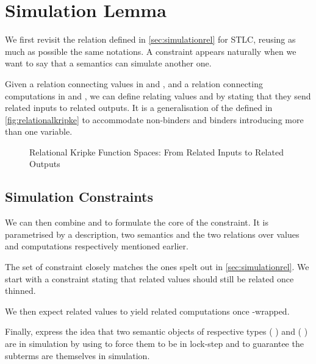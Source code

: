 \section{Simulation Lemma}\label{section:simulation}

We first revisit the  relation defined in \cref{sec:simulationrel}
for STLC, reusing as much as possible the same notations. A  constraint
appears naturally when we want to say that a semantics can simulate another one.

Given a relation  connecting values in  and , and a relation
 connecting computations in  and , we can define 
relating values    and    by
stating that they send related inputs to related outputs. It is a generalisation of
the  defined in \cref{fig:relationalkripke} to accommodate non-binders
and binders introducing more than one variable.

\begin{figure}[h]
\caption{Relational Kripke Function Spaces: From Related Inputs to Related Outputs}
\end{figure}

\subsection{Simulation Constraints}

We can then combine  and  to formulate the
core of the  constraint. It is parametrised by a description, two
semantics and the two relations over values and computations respectively mentioned
earlier.


The set of constraint closely matches the ones spelt out in \cref{sec:simulationrel}.
We start with a constraint  stating that related values should still be
related once thinned.


We then expect related values to yield related computations once -wrapped.


Finally,  express the idea that two semantic objects of respective types
   (  )
and    (  ) are in simulation by using
 to force them to be in lock-step and  to guarantee the subterms
are themselves in simulation.

